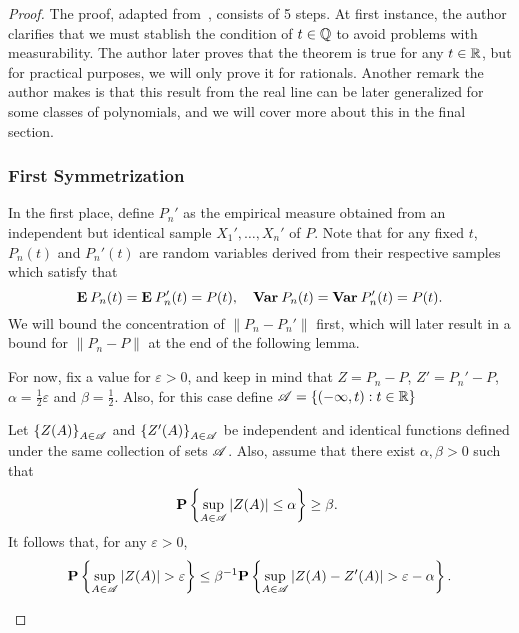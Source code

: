 \begin{proof}
  The proof, adapted from~\cite{pollard2012convergence}, consists of 5 steps. At first instance, the author clarifies that we must stablish the condition of $t\in \Q$ to avoid problems with measurability. The author later proves that the theorem is true for any $t\in \R$, but for practical purposes, we will only prove it for rationals. Another remark the author makes is that this result from the real line can be later generalized for some classes of polynomials, and we will cover more about this in the final section.

  \subsubsection*{First Symmetrization}
  In the first place, define $P_n'$ as the empirical measure obtained from an independent but identical sample $X_1',\ldots, X_n'$ of $P$. Note that for any fixed $t$, $P_n(t)$ and $P_n'(t)$ are random variables derived from their respective samples which satisfy that
  \[ \E P_n(t) = \E P_n'(t) = P(t),\hspace*{1em} \Var P_n(t) = \Var P_n'(t) = P(t). \] 
  We will bound the concentration of $\|P_n- P_n'\|$ first, which will later result in a bound for $\|P_n - P\|$ at the end of the following lemma.

  \vspace*{1em}

  For now, fix a value for $\varepsilon > 0$, and keep in mind that $Z = P_n - P$, $Z' = P_n' - P$, $\alpha = \frac{1}{2}\varepsilon$ and $\beta = \frac{1}{2}$. Also, for this case define $\AA = \{(-\infty, t) : t\in \R\}$

  \begin{lemma}\label{gc:l1}
    Let ${\{Z(A)\}}_{A\in \AA}$ and ${\{Z'(A)\}}_{A\in \AA}$ be independent and identical functions defined under the same collection of sets $\AA$. Also, assume that there exist $\alpha, \beta > 0$ such that
    \[ \P\left\{\sup_{A\in \AA} |Z(A)| \leq \alpha \right\} \geq \beta. \ \]
    It follows that, for any $\varepsilon > 0$,
    \[  \P\left\{\sup_{A\in \AA} |Z(A)| > \varepsilon \right\} \leq \beta^{-1} \P\left\{\sup_{A\in \AA} |Z(A)-Z'(A)| > \varepsilon - \alpha \right\}. \]     
  \end{lemma}


\end{proof}
